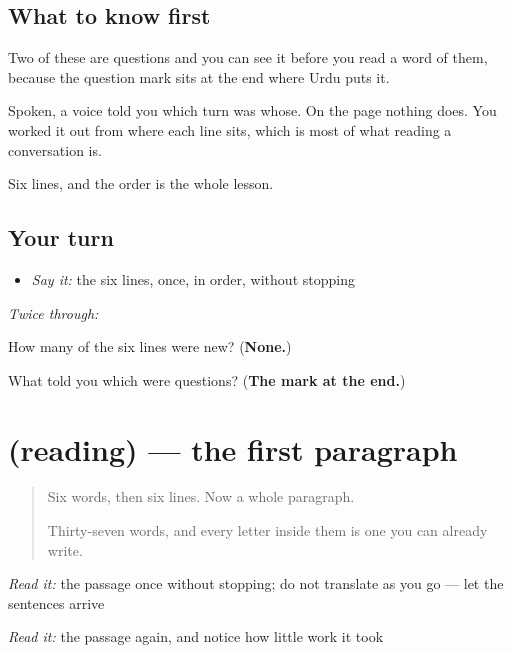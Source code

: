 \subsection*{What to know first}
Two of these are questions and you can see it before you read a word of them, because the question mark sits at the end where Urdu puts it.

Spoken, a voice told you which turn was whose. On the page nothing does. You worked it out from where each line sits, which is most of what reading a conversation is.

Six lines, and the order is the whole lesson.

\subsection*{Your turn}
\begin{itemize}
\raggedright
  \item \emph{Say it:} the six lines, once, in order, without stopping
\end{itemize}

\emph{Twice through:}

\begin{tcolorbox}[breakable,colback=teal!4,colframe=teal!35!black,title={Before you move on}]
How many of the six lines were new? (\textbf{None.})

What told you which were questions? (\textbf{The mark at the end.})
\end{tcolorbox}
\section[(reading)]{(reading) — the first paragraph}

\label{lesson:UR-C33-pehla-sabaq}



\begin{quote}
Six words, then six lines. Now a whole paragraph.

Thirty-seven words, and every letter inside them is one you can already write.
\end{quote}

\begin{tcolorbox}[breakable,skin=enhanced,colback=orange!6,colframe=orange!45!black,boxrule=0.5pt,arc=1mm,left=6pt,right=6pt,top=4pt,bottom=4pt,fonttitle=\bfseries,title={Read this}]
\begin{quote}
                                    
\end{quote}

\emph{Read it:} the passage once without stopping; do not translate as you go — let the sentences arrive

\emph{Read it:} the passage again, and notice how little work it took
\end{tcolorbox}

